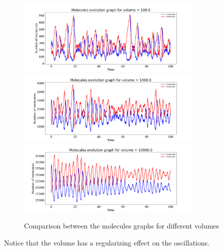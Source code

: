 \begin{figure}[H]
    \centering
    \includegraphics[width=0.8\textwidth]{FIG/exercise_7_images/gillespiexy_time_volume100.0.png} 
    \vfill
    \includegraphics[width=0.8\textwidth]{FIG/exercise_7_images/gillespiexy_time_volume1000.0.png} 
    \vfill
    \includegraphics[width=0.8\textwidth]{FIG/exercise_7_images/gillespiexy_time_volume10000.0.png}
    \caption{Comparison between the molecules graphs for different volumes}
    \label{lec7:moleculesxyevolution_comparison}
\end{figure}

Notice that the volume has a regularizing effect on the oscillations.


